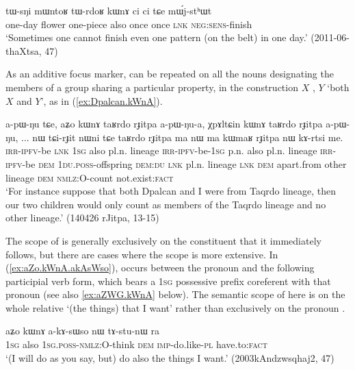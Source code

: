 \begin{exe}
\ex \label{ex:tWrdoR.kWnA}
\gll tɯ-sŋi mɯntoʁ tɯ-rdoʁ kɯnɤ ci ci tɕe mɯ́j-stʰɯt \\
one-day flower one-piece also once once \textsc{lnk} \textsc{neg}:\textsc{sens}-finish \\
\glt `Sometimes one cannot finish even one pattern (on the belt) in one day.' (2011-06-thaXtsa, 47)
\end{exe}

As an additive focus marker,  can be repeated on all the nouns designating the members of a group sharing a particular property, in the construction $X$ , $Y$   `both $X$ and $Y$', as in (\ref{ex:Dpalcan.kWnA}).

\begin{exe}
\ex \label{ex:Dpalcan.kWnA}
 \gll a-pɯ-ŋu tɕe, aʑo kɯnɤ taʁrdo rɟitpa a-pɯ-ŋu-a, χpɤltɕin kɯnɤ taʁrdo rɟitpa a-pɯ-ŋu, ... nɯ tɕi-rɟit nɯni tɕe taʁrdo rɟitpa ma nɯ ma kɯmaʁ rɟitpa nɯ kɤ-rtsi me.  \\
 \textsc{irr}-\textsc{ipfv}-be \textsc{lnk} \textsc{1sg} also pl.n. lineage  \textsc{irr}-\textsc{ipfv}-be-\textsc{1sg}  p.n. also pl.n. lineage  \textsc{irr}-\textsc{ipfv}-be { } \textsc{dem} \textsc{1du}.\textsc{poss}-offspring \textsc{dem}:\textsc{du} \textsc{lnk} pl.n. lineage \textsc{lnk} \textsc{dem} apart.from other lineage \textsc{dem} \textsc{nmlz}:O-count not.exist:\textsc{fact} \\
 \glt `For instance suppose that both Dpalcan and I were from Taqrdo lineage, then our two children would only count as members of the Taqrdo lineage and no other lineage.' (140426 rJitpa, 13-15)
\end{exe}

The scope of   is generally exclusively on the constituent that it immediately follows, but there are cases where the scope is more extensive. In (\ref{ex:aZo.kWnA.akAsWso}),  occurs between the pronoun  and the following participial verb form, which bears a \textsc{1sg} possessive prefix  coreferent with that pronoun (see also \ref{ex:aZWG.kWnA} below). The semantic scope of  here is on the whole relative  `(the things) that I want' rather than exclusively on the pronoun .

\begin{exe}
\ex \label{ex:aZo.kWnA.akAsWso}
 \gll aʑo kɯnɤ a-kɤ-sɯso nɯ tɤ-stu-nɯ ra \\
 \textsc{1sg} also \textsc{1sg}.\textsc{poss}-\textsc{nmlz}:O-think \textsc{dem} \textsc{imp}-do.like-\textsc{pl} have.to:\textsc{fact} \\
 \glt `(I will do as you say, but) do also the things I want.' (2003kAndzwsqhaj2, 47)
\end{exe}

